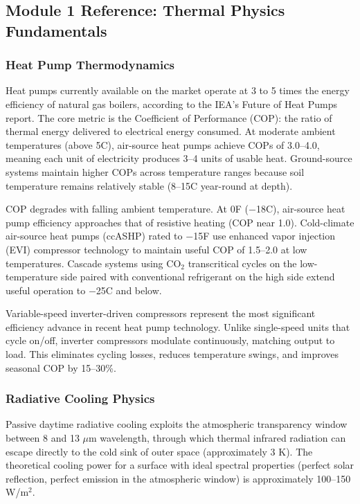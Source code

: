\documentclass[11pt,letterpaper]{article}
\begin{document}
\subsection{Module 1 Reference: Thermal Physics Fundamentals}

\subsubsection{Heat Pump Thermodynamics}
Heat pumps currently available on the market operate at 3 to 5 times the energy efficiency of natural gas boilers, according to the IEA's Future of Heat Pumps report. The core metric is the Coefficient of Performance (COP): the ratio of thermal energy delivered to electrical energy consumed. At moderate ambient temperatures (above 5\textdegree C), air-source heat pumps achieve COPs of 3.0--4.0, meaning each unit of electricity produces 3--4 units of usable heat. Ground-source systems maintain higher COPs across temperature ranges because soil temperature remains relatively stable (8--15\textdegree C year-round at depth).

COP degrades with falling ambient temperature. At 0\textdegree F ($-$18\textdegree C), air-source heat pump efficiency approaches that of resistive heating (COP near 1.0). Cold-climate air-source heat pumps (ccASHP) rated to $-$15\textdegree F use enhanced vapor injection (EVI) compressor technology to maintain useful COP of 1.5--2.0 at low temperatures. Cascade systems using CO$_2$ transcritical cycles on the low-temperature side paired with conventional refrigerant on the high side extend useful operation to $-$25\textdegree C and below.

Variable-speed inverter-driven compressors represent the most significant efficiency advance in recent heat pump technology. Unlike single-speed units that cycle on/off, inverter compressors modulate continuously, matching output to load. This eliminates cycling losses, reduces temperature swings, and improves seasonal COP by 15--30\%.

\subsubsection{Radiative Cooling Physics}
Passive daytime radiative cooling exploits the atmospheric transparency window between 8 and 13 $\mu$m wavelength, through which thermal infrared radiation can escape directly to the cold sink of outer space (approximately 3 K). The theoretical cooling power for a surface with ideal spectral properties (perfect solar reflection, perfect emission in the atmospheric window) is approximately 100--150 W/m$^{2}$.
\end{document}
